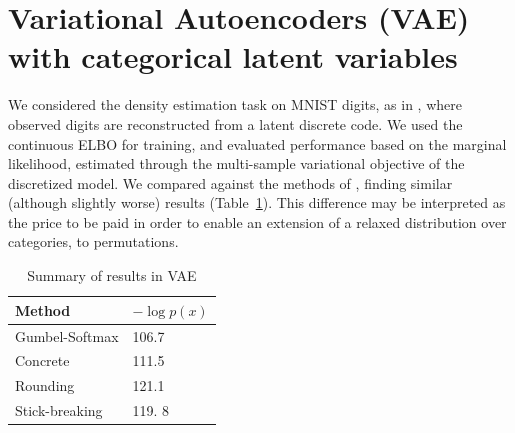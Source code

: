 \documentclass[twoside]{article}
\begin{document}


\section{Variational Autoencoders (VAE) with categorical latent variables}



We considered the density estimation task on MNIST digits, as in
\cite{maddison2016concrete, jang2016categorical}, where observed
digits are reconstructed from a latent discrete code. We used the
continuous ELBO for training, and evaluated performance based on the
marginal likelihood, estimated through the multi-sample variational
objective of the discretized model. We compared against the methods of
\cite{jang2016categorical, maddison2016concrete}, finding similar
(although slightly worse) results (Table~\ref{tab:vae}). This difference may be
interpreted as the price to be paid in order to enable an extension of
a relaxed distribution over categories, to permutations.

\begin{table}[h]
  \caption{Summary of results in VAE}
  \label{tab:vae}
  \centering
  \begin{tabular}{ll}
    \textbf{Method} & $- \log p(x)$ \\
    \hline
    Gumbel-Softmax    & 106.7 \\
    Concrete  &  111.5\\
    Rounding &  121.1 \\
    Stick-breaking & 119. 8\\
    \bottomrule
  \end{tabular}
\end{table}


   
\end{document}
